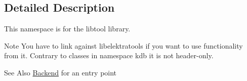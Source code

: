 \subsection{Detailed Description}
This namespace is for the libtool library. \begin{DoxyNote}{Note}
You have to link against libelektratools if you want to use functionality from it. Contrary to classes in namespace kdb it is not header-\/only.
\end{DoxyNote}
\begin{DoxySeeAlso}{See Also}
\hyperlink{classkdb_1_1tools_1_1Backend}{Backend} for an entry point 
\end{DoxySeeAlso}
